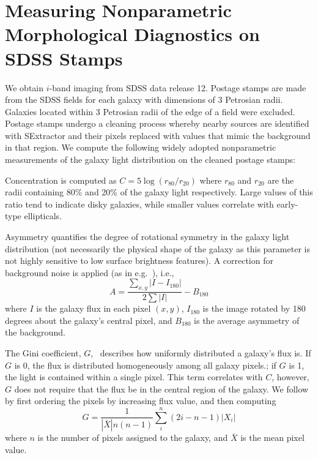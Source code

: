 \documentclass[twocolumn]{aastex6}
\newcommand{\rr}[1]{$r_{#1}$}
\begin{document}
\appendix
\label{sec:Appendix}

\section{Measuring Nonparametric Morphological Diagnostics on SDSS Stamps}
\label{sec: measuring morphology}

We obtain $i$-band imaging from SDSS data release 12. Postage stamps are made from the SDSS fields for each galaxy with dimensions of 3 Petrosian radii. Galaxies located within 3 Petrosian radii of the edge of a field were excluded.  Postage stamps undergo a cleaning process whereby nearby sources are identified with SExtractor \citep[ver. 2.8.6;][]{sextractor} and their pixels replaced with values that mimic the background in that region. We compute the following widely adopted nonparametric measurements  of the galaxy light distribution on the cleaned postage stamps:


Concentration is computed as $C = 5\log(r_{80}/ r_{20})$ where \rr{80} and \rr{20} are the radii containing 80\% and 20\% of the galaxy light respectively.  Large values of this ratio tend to indicate disky galaxies, while smaller values correlate with early-type ellipticals. 

Asymmetry quantifies the degree of rotational symmetry in the galaxy light distribution (not necessarily the physical shape of the galaxy as this parameter is not highly sensitive to low surface brightness features). A correction for background noise is applied (as in e.g.~\cite{Conselice2000}), i.e., 
\begin{equation}
A = \frac{\sum_{x,y} |I - I_{180}|}{ 2\sum|I|} - B_{180}
\end{equation}
where $I$ is the galaxy flux in each pixel $(x, y)$, $I_{180}$ is the image rotated by 180 degrees about the galaxy's central pixel, and $B_{180}$ is the average asymmetry of the background. 

The Gini coefficient, $G$,~\citep{Glasser1962, Abraham2003} describes how uniformly distributed a galaxy's flux is.  If $G$ is 0, the flux is distributed homogeneously among all galaxy pixels.; if $G$ is 1,  the light is contained within a single pixel. This term correlates with $C$, however, $G$ does not require that the flux be in the central region of the galaxy.  We follow~\cite{Lotz2004} by first ordering the pixels by increasing flux value, and then computing
\begin{equation}
G = \frac{1}{|\bar X|n(n-1)}\sum_i^n(2i-n-1)|X_i|
\end{equation}
where $n$ is the number of pixels assigned to the galaxy, and $\bar X$ is the mean pixel value. 
\end{document}
